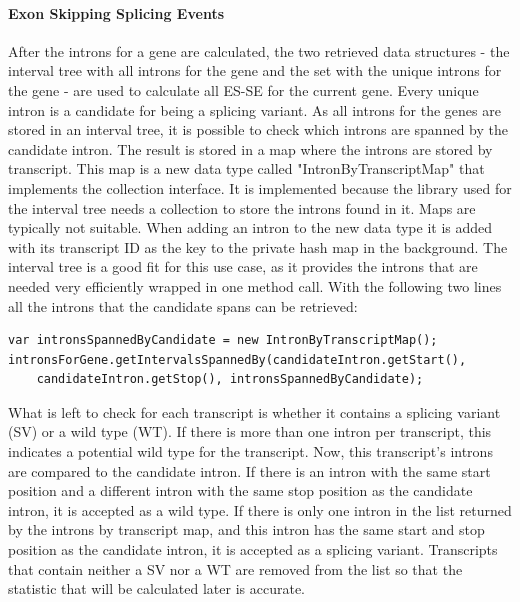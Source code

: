 \documentclass{article}
\begin{document}
    \paragraph{Exon Skipping Splicing Events}
    After the introns for a gene are calculated, the two retrieved data structures - the interval tree with all introns for the gene and the set with the unique introns for the gene - are used to calculate all ES-SE for the current gene. Every unique intron is a candidate for being a splicing variant. As all introns for the genes are stored in an interval tree, it is possible to check which introns are spanned by the candidate intron. The result is stored in a map where the introns are stored by transcript. This map is a new data type called "IntronByTranscriptMap" that implements the collection interface. It is implemented because the library used for the interval tree needs a collection to store the introns found in it. Maps are typically not suitable. When adding an intron to the new data type it is added with its transcript ID as the key to the private hash map in the background. The interval tree is a good fit for this use case, as it provides the introns that are needed very efficiently wrapped in one method call. With the following two lines all the introns that the candidate spans can be retrieved:
    \begin{verbatim}
var intronsSpannedByCandidate = new IntronByTranscriptMap();
intronsForGene.getIntervalsSpannedBy(candidateIntron.getStart(),
    candidateIntron.getStop(), intronsSpannedByCandidate);
    \end{verbatim}
    What is left to check for each transcript is whether it contains a splicing variant (SV) or a wild type (WT). If there is more than one intron per transcript, this indicates a potential wild type for the transcript. Now, this transcript's introns are compared to the candidate intron. If there is an intron with the same start position and a different intron with the same stop position as the candidate intron, it is accepted as a wild type. If there is only one intron in the list returned by the introns by transcript map, and this intron has the same start and stop position as the candidate intron, it is accepted as a splicing variant. Transcripts that contain neither a SV nor a WT are removed from the list so that the statistic that will be calculated later is accurate.
\end{document}
